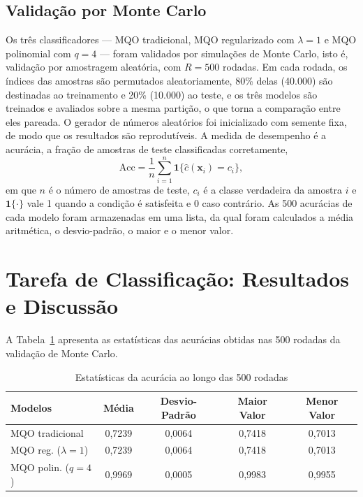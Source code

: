\documentclass[conference]{IEEEtran}
\begin{document}
\subsection{Validação por Monte Carlo}

Os três classificadores --- MQO tradicional, MQO regularizado com
$\lambda = 1$ e MQO polinomial com $q = 4$ --- foram validados por simulações de
Monte Carlo, isto é, validação por amostragem aleatória, com $R = 500$ rodadas.
Em cada rodada, os índices das amostras são permutados aleatoriamente, 80\%
delas (40.000) são destinadas ao treinamento e 20\% (10.000) ao teste, e os três
modelos são treinados e avaliados sobre a mesma partição, o que torna a
comparação entre eles pareada. O gerador de números aleatórios foi inicializado
com semente fixa, de modo que os resultados são reprodutíveis. A medida de
desempenho é a acurácia, a fração de amostras de teste classificadas
corretamente,
\begin{equation}
\mathrm{Acc} = \frac{1}{n}\sum_{i=1}^{n} \mathbf{1}\{\hat{c}(\mathbf{x}_i) = c_i\},
\label{eq:acc}
\end{equation}
em que $n$ é o número de amostras de teste, $c_i$ é a classe verdadeira da
amostra $i$ e $\mathbf{1}\{\cdot\}$ vale 1 quando a condição é satisfeita e 0
caso contrário. As 500 acurácias de cada modelo foram armazenadas em uma lista,
da qual foram calculados a média aritmética, o desvio-padrão, o maior e o menor
valor.

\section{Tarefa de Classificação: Resultados e Discussão}
\label{sec:cls-res}

A Tabela~\ref{tab:acc} apresenta as estatísticas das acurácias obtidas nas 500
rodadas da validação de Monte Carlo.

\begin{table}[htbp]
\caption{Estatísticas da acurácia ao longo das 500 rodadas}
\begin{center}
\begin{tabular}{|l|c|c|c|c|}
\hline
\textbf{Modelos} & \textbf{Média} & \textbf{Desvio-Padrão} & \textbf{Maior Valor} & \textbf{Menor Valor} \\
\hline
MQO tradicional & 0,7239 & 0,0064 & 0,7418 & 0,7013 \\
\hline
MQO reg. ($\lambda = 1$) & 0,7239 & 0,0064 & 0,7418 & 0,7013 \\
\hline
MQO polin. ($q = 4$) & 0,9969 & 0,0005 & 0,9983 & 0,9955 \\
\hline
\end{tabular}
\label{tab:acc}
\end{center}
\end{table}
\end{document}
